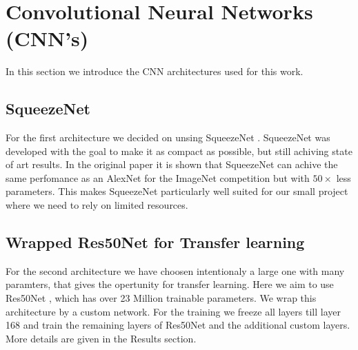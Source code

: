 \documentclass[11pt]{article}
\begin{document}

\section{Convolutional Neural Networks (CNN's)}
In this section we introduce the CNN architectures used for this work.

\subsection{SqueezeNet}
For the first architecture we decided on unsing SqueezeNet \cite{iandola2016}. SqueezeNet was developed with the goal to make it as compact as possible, but still achiving state of art results. In the original paper it is shown that SqueezeNet can achive the same perfomance as an AlexNet for the ImageNet competition but with $50\times$ less parameters. This makes SqueezeNet particularly well suited for our small project where we need to rely on limited resources.


\subsection{Wrapped Res50Net for Transfer learning}
For the second architecture we have choosen intentionaly a large one with many paramters, that gives the opertunity for transfer learning. Here we aim to use Res50Net \cite{he2016deep}, which has over 23 Million trainable parameters. We wrap this architecture by a custom network. For the training we freeze all layers till layer 168 and train the remaining layers of Res50Net and the additional custom layers. More details are given in the Results section.
\end{document}
